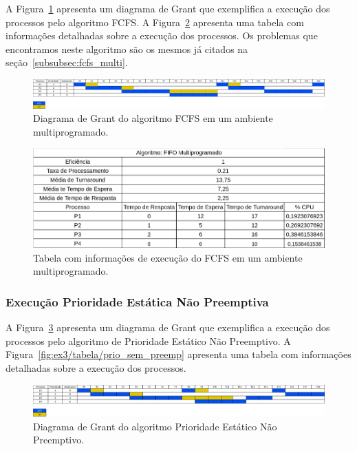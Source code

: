 \documentclass[
	12pt,				%
	oneside,   	        %
	a4paper,			%
	english,			%
	french,				%
	spanish,			%
	brazil,				%
	]{pacotes/abntex2}
\begin{document}
A Figura~\ref{fig:ex3/diagrama/fcfs_multi} apresenta um diagrama de Grant que exemplifica a execução dos processos pelo algoritmo FCFS. A Figura~\ref{fig:ex3/tabela/fcfs_multi} apresenta uma tabela com informações detalhadas sobre a execução dos processos. Os problemas que encontramos neste algoritmo são os mesmos já citados na seção~\ref{subsubsec:fcfs_multi}.

\begin{figure}[H]
  \centering
  \includegraphics[scale=0.20]{figuras/ex3/diagrama/fcfs_multi.png}
  \caption{Diagrama de Grant do algoritmo FCFS em um ambiente multiprogramado.}
  \label{fig:ex3/diagrama/fcfs_multi}
\end{figure}

\begin{figure}[H]
  \centering
  \includegraphics[scale=0.5]{figuras/ex3/tabela/fcfs_multi.png}
  \caption{Tabela com informações de execução do FCFS em um ambiente multiprogramado.}
  \label{fig:ex3/tabela/fcfs_multi}
\end{figure}


\subsubsection{Execução Prioridade Estática Não Preemptiva}
\label{subsubsec:prio_sem_preemp}

A Figura~\ref{fig:ex3/diagrama/prio_sem_preemp} apresenta um diagrama de Grant que exemplifica a execução dos processos pelo algoritmo de Prioridade Estático Não Preemptivo. A Figura~\ref{fig:ex3/tabela/prio_sem_preemp} apresenta uma tabela com informações detalhadas sobre a execução dos processos. 

\begin{figure}[H]
  \centering
  \includegraphics[scale=0.20]{figuras/ex3/diagrama/prio_sem_preemp.png}
  \caption{Diagrama de Grant do algoritmo Prioridade Estático Não Preemptivo.}
  \label{fig:ex3/diagrama/prio_sem_preemp}
\end{figure}
\end{document}
